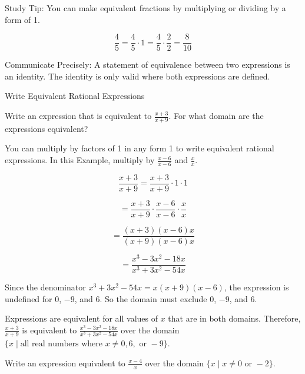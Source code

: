 \documentclass{article}
\newenvironment{concept-box}{}{}        %
\newenvironment{example}[1]{}{}         %
\newenvironment{tryit}[1]{}{}           %
\newcommand{\answer}[1]{}               %
\begin{document}
\begin{concept-box}
Study Tip: You can make equivalent fractions by multiplying or dividing by a form of 1.

\[
\frac{4}{5}=\frac{4}{5}\cdot 1=\frac{4}{5}\cdot\frac{2}{2}=\frac{8}{10}
\]
\end{concept-box}

\begin{concept-box}
Communicate Precisely: A statement of equivalence between two expressions is an identity. The identity is only valid where both expressions are defined.
\end{concept-box}

\begin{example}{1}
Write Equivalent Rational Expressions

Write an expression that is equivalent to \(\frac{x+3}{x+9}\). For what domain are the expressions equivalent?

You can multiply by factors of 1 in any form 1 to write equivalent rational expressions. In this Example, multiply by \(\frac{x-6}{x-6}\) and \(\frac{x}{x}\).

\[
\frac{x+3}{x+9}=\frac{x+3}{x+9}\cdot 1\cdot 1
\]

\[
=\frac{x+3}{x+9}\cdot \frac{x-6}{x-6}\cdot \frac{x}{x}
\]

\[
=\frac{(x+3)(x-6)x}{(x+9)(x-6)x}
\]

\[
=\frac{x^3-3x^2-18x}{x^3+3x^2-54x}
\]

Since the denominator \(x^3+3x^2-54x=x(x+9)(x-6)\), the expression is undefined for \(0\), \(-9\), and \(6\). So the domain must exclude \(0\), \(-9\), and \(6\).

Expressions are equivalent for all values of \(x\) that are in both domains. Therefore, \(\frac{x+3}{x+9}\) is equivalent to \(\frac{x^3-3x^2-18x}{x^3+3x^2-54x}\) over the domain \(\{x \mid \text{all real numbers where }x\ne 0,6,\text{ or }-9\}\).

\answer{\(\frac{x^3-3x^2-18x}{x^3+3x^2-54x}\) over the domain \(\{x \mid x\ne 0,6,\text{ or }-9\}\)}
\end{example}

\begin{tryit}{1}
Write an expression equivalent to \(\frac{x-4}{x}\) over the domain \(\{x\mid x\ne 0\text{ or }-2\}\).

\answer{\(\frac{x^2-2x-8}{x^2+2x}\)}
\end{tryit}
\end{document}
